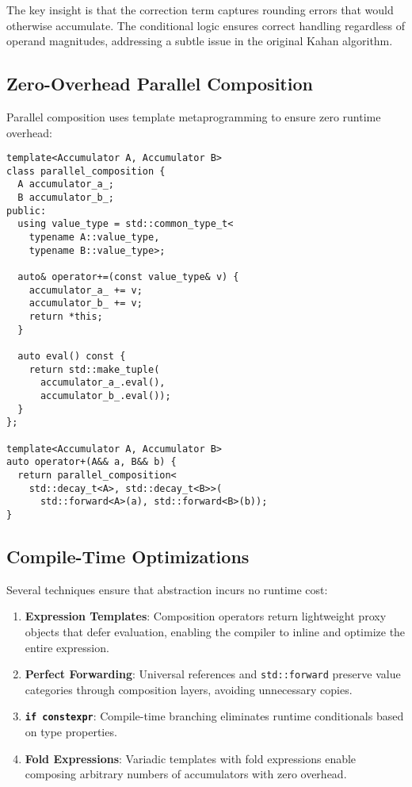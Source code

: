\documentclass[sigconf]{acmart}
\begin{document}
The key insight is that the correction term captures rounding errors that would otherwise accumulate. The conditional logic ensures correct handling regardless of operand magnitudes, addressing a subtle issue in the original Kahan algorithm.

\subsection{Zero-Overhead Parallel Composition}

Parallel composition uses template metaprogramming to ensure zero runtime overhead:

\begin{lstlisting}[caption={Parallel composition implementation},label={lst:parallel}]
template<Accumulator A, Accumulator B>
class parallel_composition {
  A accumulator_a_;
  B accumulator_b_;
public:
  using value_type = std::common_type_t<
    typename A::value_type,
    typename B::value_type>;

  auto& operator+=(const value_type& v) {
    accumulator_a_ += v;
    accumulator_b_ += v;
    return *this;
  }

  auto eval() const {
    return std::make_tuple(
      accumulator_a_.eval(),
      accumulator_b_.eval());
  }
};

template<Accumulator A, Accumulator B>
auto operator+(A&& a, B&& b) {
  return parallel_composition<
    std::decay_t<A>, std::decay_t<B>>(
      std::forward<A>(a), std::forward<B>(b));
}
\end{lstlisting}

\subsection{Compile-Time Optimizations}

Several techniques ensure that abstraction incurs no runtime cost:

\begin{enumerate}
\item \textbf{Expression Templates}: Composition operators return lightweight proxy objects that defer evaluation, enabling the compiler to inline and optimize the entire expression.

\item \textbf{Perfect Forwarding}: Universal references and \texttt{std::forward} preserve value categories through composition layers, avoiding unnecessary copies.

\item \textbf{\texttt{if constexpr}}: Compile-time branching eliminates runtime conditionals based on type properties.

\item \textbf{Fold Expressions}: Variadic templates with fold expressions enable composing arbitrary numbers of accumulators with zero overhead.
\end{enumerate}
\end{document}
